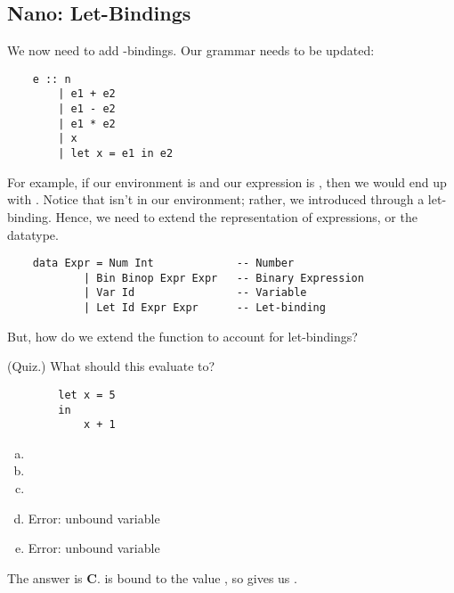\documentclass[letterpaper]{article}
\begin{document}
\subsection{Nano: Let-Bindings}
We now need to add -bindings. Our grammar needs to be updated:
\begin{verbatim}
    e :: n 
        | e1 + e2 
        | e1 - e2 
        | e1 * e2 
        | x 
        | let x = e1 in e2 \end{verbatim}

For example, if our environment is \code{[]} and our expression is , then we would end up with . Notice that  isn't in our environment; rather, we introduced   through a let-binding. Hence, we need to extend the representation of expressions, or the datatype. 
\begin{verbatim}
    data Expr = Num Int             -- Number 
            | Bin Binop Expr Expr   -- Binary Expression
            | Var Id                -- Variable 
            | Let Id Expr Expr      -- Let-binding \end{verbatim}

But, how do we extend the  function to account for let-bindings? 

\begin{mdframed}[]
    (Quiz.) What should this evaluate to? 
    \begin{verbatim}
        let x = 5
        in 
            x + 1\end{verbatim}
    \begin{enumerate}[(a)]
        \item {}
        \item {}
        \item {}
        \item Error: unbound variable 
        \item Error: unbound variable 
    \end{enumerate}

    \begin{mdframed}[]
        The answer is \textbf{C}.  is bound to the value , so  gives us .
    \end{mdframed}
\end{mdframed}
\end{document}
